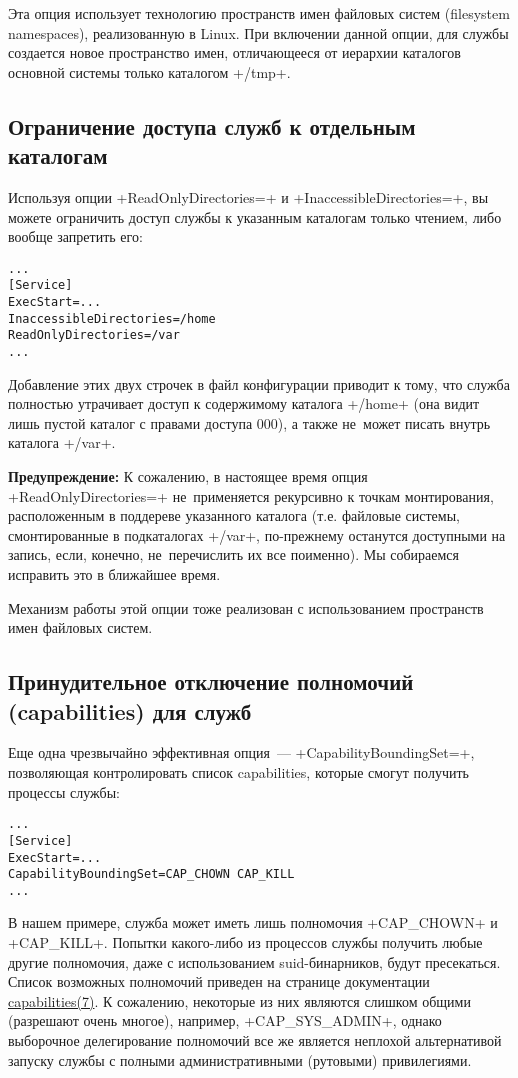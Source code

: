 \documentclass[10pt,oneside,a4paper]{article}
\newenvironment{caveat}[1][]{\smallskip\par\textbf{Предупреждение#1: }}%
	{\smallskip\par}
\begin{document}
Эта опция использует технологию пространств имен файловых систем (filesystem
namespaces), реализованную в Linux. При включении данной опции, для службы
создается новое пространство имен, отличающееся от иерархии каталогов основной
системы только каталогом +/tmp+.

\subsection{Ограничение доступа служб к отдельным каталогам}

Используя опции +ReadOnlyDirectories=+ и +InaccessibleDirectories=+, вы можете
ограничить доступ службы к указанным каталогам только чтением, либо вообще
запретить его:
\begin{Verbatim}
...
[Service]
ExecStart=...
InaccessibleDirectories=/home
ReadOnlyDirectories=/var
...
\end{Verbatim}
Добавление этих двух строчек в файл конфигурации приводит к тому, что служба
полностью утрачивает доступ к содержимому каталога +/home+ (она видит лишь
пустой каталог с правами доступа 000), а также не~может писать внутрь каталога
+/var+.

\begin{caveat}
К сожалению, в настоящее время опция +ReadOnlyDirectories=+ не~применяется
рекурсивно к точкам монтирования, расположенным в поддереве указанного каталога
(т.е. файловые системы, смонтированные в подкаталогах +/var+, по-прежнему
останутся доступными на запись, если, конечно, не~перечислить их все поименно).
Мы собираемся исправить это в ближайшее время.
\end{caveat}

Механизм работы этой опции тоже реализован с использованием пространств имен
файловых систем.

\subsection{Принудительное отключение полномочий (capabilities) для служб}

Еще одна чрезвычайно эффективная опция~--- +CapabilityBoundingSet=+, позволяющая
контролировать список capabilities, которые смогут получить процессы службы:
\begin{Verbatim}
...
[Service]
ExecStart=...
CapabilityBoundingSet=CAP_CHOWN CAP_KILL
...
\end{Verbatim}
В нашем примере, служба может иметь лишь полномочия +CAP_CHOWN+ и +CAP_KILL+.
Попытки какого-либо из процессов службы получить любые другие полномочия, даже с
использованием suid-бинарников, будут пресекаться. Список возможных полномочий
приведен на странице документации
\href{http://linux.die.net/man/7/capabilities}{capabilities(7)}. К сожалению,
некоторые из них являются слишком общими (разрешают очень многое), например,
+CAP_SYS_ADMIN+, однако выборочное делегирование полномочий все же является
неплохой альтернативой запуску службы с полными административными (рутовыми)
привилегиями.
\end{document}
